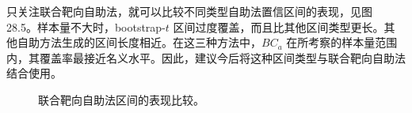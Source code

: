 只关注联合靶向自助法，就可以比较不同类型自助法置信区间的表现，见图 28.5。样本量不大时，bootstrap-$t$ 区间过度覆盖，而且比其他区间类型更长。其他自助方法生成的区间长度相近。在这三种方法中，$BC_a$ 在所考察的样本量范围内，其覆盖率最接近名义水平。因此，建议今后将这种区间类型与联合靶向自助法结合使用。

\begin{landscape}
\begin{figure}[p]
\centering

\caption{联合靶向自助法区间的表现比较。}
\label{fig:ch28-joint-comparison}
\end{figure}
\end{landscape}

